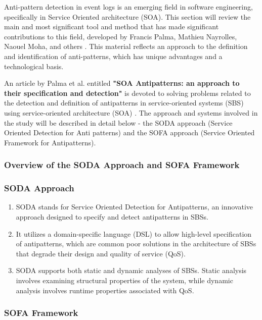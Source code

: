 \documentclass[12pt, times]{article}
\begin{document}
\hspace*{5mm} Anti-pattern detection in event logs is an emerging field in software engineering, specifically in Service Oriented architecture (SOA). This section will review the main and most significant tool and method that has made significant contributions to this field, developed by Francis Palma, Mathieu Nayrolles, Naouel Moha, and others \cite{doc}. This material reflects an approach to the definition and identification of anti-patterns, which has unique advantages and a technological basis.

\hspace*{5mm} An article by Palma et al. entitled \textbf{"SOA Antipatterns: an approach to their specification and detection"} is devoted to solving problems related to the detection and definition of antipatterns in service-oriented systems (SBS) using service-oriented architecture (SOA) \cite{soa_3}. The approach and systems involved in the study will be described in detail below - the SODA approach (Service Oriented Detection for Anti patterns) and the SOFA approach (Service Oriented Framework for Antipatterns).

\subsubsection{Overview of the SODA Approach and SOFA Framework}

\subsubsection*{SODA Approach}

\begin{enumerate}
	\item SODA stands for Service Oriented Detection for Antipatterns, an innovative approach designed to specify and detect antipatterns in SBSs.
	\item It utilizes a domain-specific language (DSL) to allow high-level specification of antipatterns, which are common poor solutions in the architecture of SBSs that degrade their design and quality of service (QoS).
	\item SODA supports both static and dynamic analyses of SBSs. Static analysis involves examining structural properties of the system, while dynamic analysis involves runtime properties associated with QoS.
\end{enumerate}

\subsubsection*{SOFA Framework}
\end{document}
